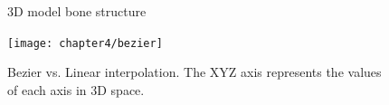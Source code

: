\documentclass[12pt]{ociamthesis}  %
\begin{document}
\begin{figure}[H]
\centering
\begin{subfigure}[b]{.6\textwidth}
	\captionsetup{width=0.8\textwidth}
  \centering
  \caption{}
\end{subfigure}%
\begin{subfigure}[b]{.6\textwidth}
 \captionsetup{justification=justified, width=0.5\textwidth}
\footnotesize
\begin{minipage}[t]{0.5\linewidth}
\end{minipage}
  \caption{}
\end{subfigure}
\caption{3D model bone structure}
\label{fig:struct}
\end{figure}

\begin{figure}[H]
	\centering
    \texttt{[image: chapter4/bezier]}
    \caption[Bezier vs. Linear interpolation]{Bezier vs. Linear interpolation. The XYZ axis represents the values of each axis in 3D space.}
    \label{fig:bezier}
\end{figure}	
\end{document}
